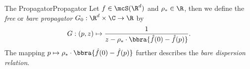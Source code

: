 \begin{mdef}{The Propagator}{Propagator}
    Let $f\in\mcS(\R^d)$ and $\rho_*\in\R$, then we define the \textit{free} or \emph{bare propagator} $G_0:\R^d\times\C\to\R$ by
    \[
        G:(p,z)\mapsto \frac{1}{z - \rho_*\cdot\bbra{\hat f(0) - \hat f(p)}}.
    \]
    The mapping $p\mapsto \rho_*\cdot\bbra{\hat f(0) - \hat f(p)}$ further describes the \textit{bare dispersion relation}.
\end{mdef}